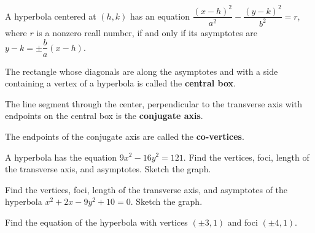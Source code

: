 

\begin{proposition}
    A hyperbola centered at $(h,k)$ has an equation $\dfrac{(x-h)^2}{a^2}-\dfrac{(y-k)^2}{b^2}=r$, where $r$ is a nonzero reall number, if and only if its asymptotes are $y-k=\pm\dfrac{b}{a}(x-h)$.
\end{proposition}

\begin{definition}
  The rectangle whose diagonals are along the asymptotes and with a side containing a vertex of a hyperbola is called the \textbf{central box}.
  
  The line segment through the center, perpendicular to the transverse axis with endpoints on the central box is the \textbf{conjugate axis}.
  
  The endpoints of the conjugate axis are called the \textbf{co-vertices}.
\end{definition}


\begin{example}
    A hyperbola has the equation $9x^2-16y^2=121$.
Find the vertices, foci, length of the transverse axis, and asymptotes. Sketch the graph.
\end{example}

\newpage

\begin{example}
    Find the vertices, foci, length of the transverse axis, and asymptotes of the hyperbola $x^2+2x-9y^2+10=0$. Sketch the graph.
\end{example}

\begin{example}
    Find the equation of the hyperbola with vertices $(\pm 3, 1)$ and foci $(\pm 4, 1)$.
\end{example}

